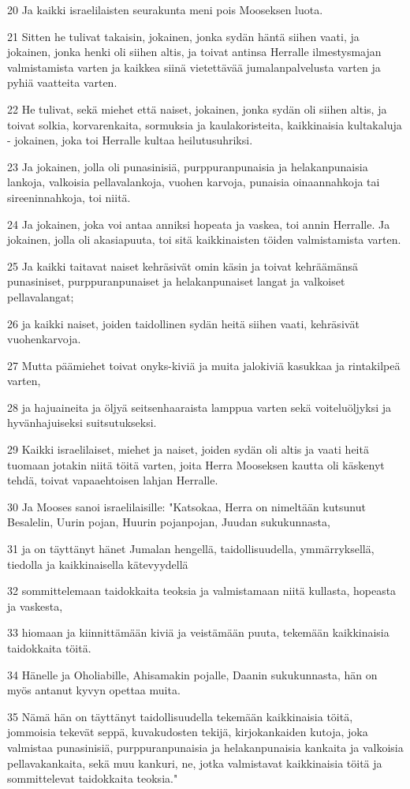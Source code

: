 \par 20 Ja kaikki israelilaisten seurakunta meni pois Mooseksen luota.
\par 21 Sitten he tulivat takaisin, jokainen, jonka sydän häntä siihen vaati, ja jokainen, jonka henki oli siihen altis, ja toivat antinsa Herralle ilmestysmajan valmistamista varten ja kaikkea siinä vietettävää jumalanpalvelusta varten ja pyhiä vaatteita varten.
\par 22 He tulivat, sekä miehet että naiset, jokainen, jonka sydän oli siihen altis, ja toivat solkia, korvarenkaita, sormuksia ja kaulakoristeita, kaikkinaisia kultakaluja - jokainen, joka toi Herralle kultaa heilutusuhriksi.
\par 23 Ja jokainen, jolla oli punasinisiä, purppuranpunaisia ja helakanpunaisia lankoja, valkoisia pellavalankoja, vuohen karvoja, punaisia oinaannahkoja tai sireeninnahkoja, toi niitä.
\par 24 Ja jokainen, joka voi antaa anniksi hopeata ja vaskea, toi annin Herralle. Ja jokainen, jolla oli akasiapuuta, toi sitä kaikkinaisten töiden valmistamista varten.
\par 25 Ja kaikki taitavat naiset kehräsivät omin käsin ja toivat kehräämänsä punasiniset, purppuranpunaiset ja helakanpunaiset langat ja valkoiset pellavalangat;
\par 26 ja kaikki naiset, joiden taidollinen sydän heitä siihen vaati, kehräsivät vuohenkarvoja.
\par 27 Mutta päämiehet toivat onyks-kiviä ja muita jalokiviä kasukkaa ja rintakilpeä varten,
\par 28 ja hajuaineita ja öljyä seitsenhaaraista lamppua varten sekä voiteluöljyksi ja hyvänhajuiseksi suitsutukseksi.
\par 29 Kaikki israelilaiset, miehet ja naiset, joiden sydän oli altis ja vaati heitä tuomaan jotakin niitä töitä varten, joita Herra Mooseksen kautta oli käskenyt tehdä, toivat vapaaehtoisen lahjan Herralle.
\par 30 Ja Mooses sanoi israelilaisille: "Katsokaa, Herra on nimeltään kutsunut Besalelin, Uurin pojan, Huurin pojanpojan, Juudan sukukunnasta,
\par 31 ja on täyttänyt hänet Jumalan hengellä, taidollisuudella, ymmärryksellä, tiedolla ja kaikkinaisella kätevyydellä
\par 32 sommittelemaan taidokkaita teoksia ja valmistamaan niitä kullasta, hopeasta ja vaskesta,
\par 33 hiomaan ja kiinnittämään kiviä ja veistämään puuta, tekemään kaikkinaisia taidokkaita töitä.
\par 34 Hänelle ja Oholiabille, Ahisamakin pojalle, Daanin sukukunnasta, hän on myös antanut kyvyn opettaa muita.
\par 35 Nämä hän on täyttänyt taidollisuudella tekemään kaikkinaisia töitä, jommoisia tekevät seppä, kuvakudosten tekijä, kirjokankaiden kutoja, joka valmistaa punasinisiä, purppuranpunaisia ja helakanpunaisia kankaita ja valkoisia pellavakankaita, sekä muu kankuri, ne, jotka valmistavat kaikkinaisia töitä ja sommittelevat taidokkaita teoksia."

